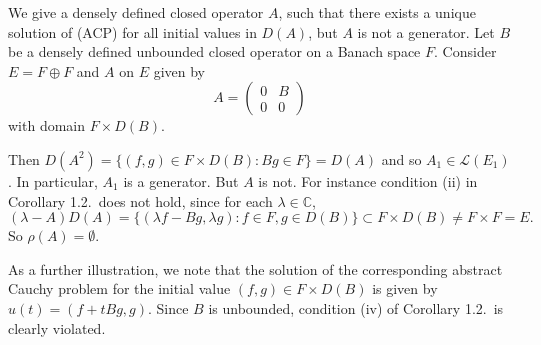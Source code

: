 \begin{example}\label{ex:1.4}
We give a densely defined closed operator $A$, such that there exists a unique solution of (ACP) for all initial values in $D(A)$, but $A$ is not a generator.
Let $B$ be a densely defined unbounded closed operator on a Banach space $F$.
Consider $E = F \oplus F$ and $A$ on $E$ given by
\[
A = \begin{pmatrix} 0 & B \\ 0 & 0 \end{pmatrix}
\]
with domain $F \times D(B)$.

Then $D(A^{2}) = \{(f,g) \in F \times D(B) : Bg \in F\} = D(A)$ and so $A_{1} \in \mathcal{L}(E_{1})$.
In particular, $A_{1}$ is a generator.
But $A$ is not.
For instance condition (ii) in Corollary 1.2.\ does not hold, since for each $\lambda \in \mathbb{C}$,
\[
(\lambda-A)D(A) = \{(\lambda f-Bg,\lambda g) : f \in F, g \in D(B)\} \subset F \times D(B) \neq F \times F = E.
\]
So $\rho(A) = \emptyset$.
\end{example}

As a further illustration, we note that the solution of the corresponding abstract Cauchy problem for the initial value $(f,g) \in F \times D(B)$ is given by $u(t) = (f + tBg,g)$.
Since $B$ is unbounded, condition (iv) of Corollary 1.2.\ is clearly violated.

